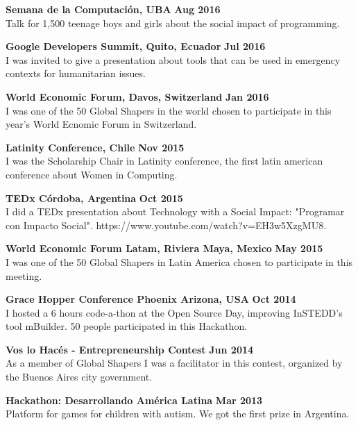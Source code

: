 \documentclass[margin,line]{resume}
\begin{document}
\begin{resume}
\textbf{Semana de la Computaci\'on, UBA} \hfill \textbf{Aug 2016} \vspace{2mm} \\
Talk for 1,500 teenage boys and girls about the social impact of programming.

\textbf{Google Developers Summit, Quito, Ecuador} \hfill \textbf{Jul 2016} \vspace{2mm} \\
I was invited to give a presentation about tools that can be used in emergency contexts for humanitarian issues.

\textbf{World Economic Forum, Davos, Switzerland} \hfill \textbf{Jan 2016} \vspace{2mm} \\
I was one of the 50 Global Shapers in the world chosen to participate in this year's World Ecnomic Forum in Switzerland.

\textbf{Latinity Conference, Chile} \hfill \textbf{Nov 2015} \vspace{2mm} \\
I was the Scholarship Chair in Latinity conference, the first latin american conference about Women in Computing.

\textbf{TEDx C\'ordoba, Argentina} \hfill \textbf{Oct 2015} \vspace{2mm} \\
I did a TEDx presentation about Technology with a Social Impact: "Programar con Impacto Social". https://www.youtube.com/watch?v=EH3w5XzgMU8.

\textbf{World Economic Forum Latam, Riviera Maya, Mexico} \hfill \textbf{May 2015} \vspace{2mm} \\
I was one of the 50 Global Shapers in Latin America chosen to participate in this meeting.

\textbf{Grace Hopper Conference Phoenix Arizona, USA} \hfill \textbf{Oct 2014} \vspace{2mm} \\
I hosted a 6 hours code-a-thon at the Open Source Day, improving InSTEDD's tool mBuilder. 50 people participated in this Hackathon. 

\textbf{Vos lo Hac\'es - Entrepreneurship Contest} \hfill \textbf{Jun 2014} \vspace{2mm} \\
As a member of Global Shapers I was a facilitator in this contest, organized by the Buenos Aires city government.
 
\textbf{Hackathon: Desarrollando Am\'erica Latina} \hfill \textbf{Mar 2013} \vspace{2mm} \\
Platform for games for children with autism. We got the first prize in Argentina.


\end{resume}
\end{document}
